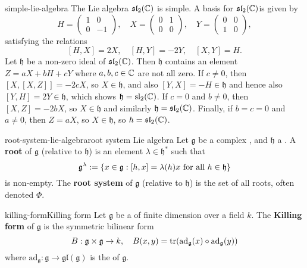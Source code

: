 \begin{example}{simple-lie-algebra}
    The Lie algebra $\mathfrak{sl}_2(\mathbb{C})$ is simple. A basis for $\mathfrak{sl}_2(\mathbb{C})$is given by
    \[ H = \begin{pmatrix} 1 & 0 \\ 0 & -1 \end{pmatrix}, \quad X = \begin{pmatrix} 0 & 1 \\ 0 & 0 \end{pmatrix}, \quad Y = \begin{pmatrix} 0 & 0 \\ 1 & 0 \end{pmatrix} , \]
    satisfying the relations
    \[ [H, X] = 2X, \quad [H, Y] = -2Y, \quad [X, Y] = H . \]
    Let $\mathfrak{h}$ be a non-zero ideal of $\mathfrak{sl}_2(\mathbb{C})$. Then $\mathfrak{h}$ contains an element $Z = aX + bH + cY$ where $a, b, c \in \mathbb{C}$ are not all zero. If $c \ne 0$, then $[X, [X, Z]] = -2cX$, so $X \in \mathfrak{h}$, and also $[Y, X] = -H \in \mathfrak{h}$ and hence also $[Y, H] = 2Y \in \mathfrak{h}$, which shows $\mathfrak{h} = \textup{sl}_2(\mathbb{C})$. If $c = 0$ and $b \ne 0$, then $[X, Z] = -2bX$, so $X \in \mathfrak{h}$ and similarly $\mathfrak{h} = \mathfrak{sl}_2(\mathbb{C})$. Finally, if $b = c = 0$ and $a \ne 0$, then $Z = aX$, so $X \in \mathfrak{h}$, so $h = \mathfrak{sl}_2(\mathbb{C})$.
\end{example}

\begin{topic}{root-system-lie-algebra}{root system Lie algebra}
    Let $\mathfrak{g}$ be a complex  , and $\mathfrak{h}$ a . A \textbf{root} of $\mathfrak{g}$ (relative to $\mathfrak{h}$) is an element $\lambda \in \mathfrak{h}^*$ such that
    \[ \mathfrak{g}^\lambda := \{ x \in \mathfrak{g} : [h, x] = \lambda(h) x \textup{ for all } h \in \mathfrak{h} \} \]
    is non-empty. The \textbf{root system} of $\mathfrak{g}$ (relative to $\mathfrak{h}$) is the set of all roots, often denoted $\Phi$.
\end{topic}

\begin{topic}{killing-form}{Killing form}
    Let $\mathfrak{g}$ be a  of finite dimension over a field $k$. The \textbf{Killing form} of $\mathfrak{g}$ is the symmetric bilinear form
    \[ B : \mathfrak{g} \times \mathfrak{g} \to k, \quad B(x, y) = \textup{tr}(\textup{ad}_{\mathfrak{g}}(x) \circ \textup{ad}_{\mathfrak{g}}(y)) \]
    where $\text{ad}_\mathfrak{g} : \mathfrak{g} \to \mathfrak{gl}(\mathfrak{g})$ is the  of $\mathfrak{g}$.
\end{topic}

